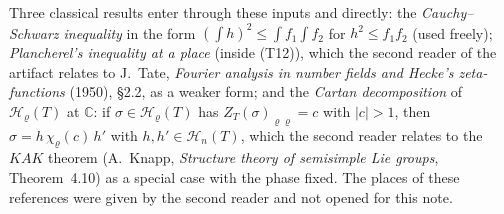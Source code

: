 \documentclass[11pt,a4paper]{article}
\theoremstyle{plainx}
\theoremstyle{uprightx}
\newcommand{\CC}{\mathbb{C}}
\newcommand{\Hl}[2]{\mathcal{H}_{#1}(#2)}
\newcommand{\ZT}[2]{Z_{#1}(#2)}
\newcommand{\boost}[2]{\chi_{#1}(#2)}
\newcommand{\Inp}[1]{\textup{(#1)}}
\begin{document}
Three classical results enter through these inputs and directly: the \emph{Cauchy--Schwarz inequality} in the form
$(\int h)^2\le\int f_1\int f_2$ for $h^2\le f_1f_2$ (used freely); \emph{Plancherel's inequality at a place} (inside
\Inp{T12}), which the second reader of the artifact relates to J.~Tate, \emph{Fourier analysis in number fields and
Hecke's zeta-functions} (1950), \S2.2, as a weaker form; and the \emph{Cartan decomposition} of
$\Hl{\varrho}{T}$ at $\CC$: if $\sigma\in\Hl{\varrho}{T}$ has $\ZT{T}{\sigma}_{\varrho\varrho}=c$ with $|c|>1$, then
$\sigma=h\,\boost{\varrho}{c}\,h'$ with $h,h'\in\Hl{n}{T}$, which the second reader relates to the $KAK$ theorem
(A.~Knapp, \emph{Structure theory of semisimple Lie groups}, Theorem~4.10) as a special case with the phase fixed. The
places of these references were given by the second reader and not opened for this note.
\end{document}
